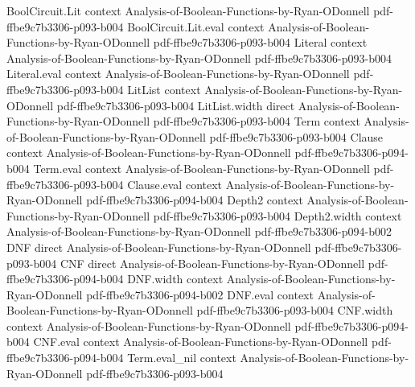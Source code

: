 \begin{lemma}
\leanok
{}
\proofstep
  {BoolCircuit.Lit}
  {context}
  {Analysis-of-Boolean-Functions-by-Ryan-ODonnell}
  {pdf-ffbe9c7b3306-p093-b004}
\proofstep
  {BoolCircuit.Lit.eval}
  {context}
  {Analysis-of-Boolean-Functions-by-Ryan-ODonnell}
  {pdf-ffbe9c7b3306-p093-b004}
\proofstep
  {Literal}
  {context}
  {Analysis-of-Boolean-Functions-by-Ryan-ODonnell}
  {pdf-ffbe9c7b3306-p093-b004}
\proofstep
  {Literal.eval}
  {context}
  {Analysis-of-Boolean-Functions-by-Ryan-ODonnell}
  {pdf-ffbe9c7b3306-p093-b004}
\proofstep
  {LitList}
  {context}
  {Analysis-of-Boolean-Functions-by-Ryan-ODonnell}
  {pdf-ffbe9c7b3306-p093-b004}
\proofstep
  {LitList.width}
  {direct}
  {Analysis-of-Boolean-Functions-by-Ryan-ODonnell}
  {pdf-ffbe9c7b3306-p093-b004}
\proofstep
  {Term}
  {context}
  {Analysis-of-Boolean-Functions-by-Ryan-ODonnell}
  {pdf-ffbe9c7b3306-p093-b004}
\proofstep
  {Clause}
  {context}
  {Analysis-of-Boolean-Functions-by-Ryan-ODonnell}
  {pdf-ffbe9c7b3306-p094-b004}
\proofstep
  {Term.eval}
  {context}
  {Analysis-of-Boolean-Functions-by-Ryan-ODonnell}
  {pdf-ffbe9c7b3306-p093-b004}
\proofstep
  {Clause.eval}
  {context}
  {Analysis-of-Boolean-Functions-by-Ryan-ODonnell}
  {pdf-ffbe9c7b3306-p094-b004}
\proofstep
  {Depth2}
  {context}
  {Analysis-of-Boolean-Functions-by-Ryan-ODonnell}
  {pdf-ffbe9c7b3306-p093-b004}
\proofstep
  {Depth2.width}
  {context}
  {Analysis-of-Boolean-Functions-by-Ryan-ODonnell}
  {pdf-ffbe9c7b3306-p094-b002}
\proofstep
  {DNF}
  {direct}
  {Analysis-of-Boolean-Functions-by-Ryan-ODonnell}
  {pdf-ffbe9c7b3306-p093-b004}
\proofstep
  {CNF}
  {direct}
  {Analysis-of-Boolean-Functions-by-Ryan-ODonnell}
  {pdf-ffbe9c7b3306-p094-b004}
\proofstep
  {DNF.width}
  {context}
  {Analysis-of-Boolean-Functions-by-Ryan-ODonnell}
  {pdf-ffbe9c7b3306-p094-b002}
\proofstep
  {DNF.eval}
  {context}
  {Analysis-of-Boolean-Functions-by-Ryan-ODonnell}
  {pdf-ffbe9c7b3306-p093-b004}
\proofstep
  {CNF.width}
  {context}
  {Analysis-of-Boolean-Functions-by-Ryan-ODonnell}
  {pdf-ffbe9c7b3306-p094-b004}
\proofstep
  {CNF.eval}
  {context}
  {Analysis-of-Boolean-Functions-by-Ryan-ODonnell}
  {pdf-ffbe9c7b3306-p094-b004}
\proofstep
  {Term.eval_nil}
  {context}
  {Analysis-of-Boolean-Functions-by-Ryan-ODonnell}
  {pdf-ffbe9c7b3306-p093-b004}

\end{lemma}

